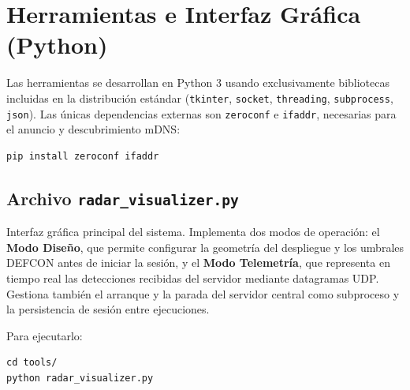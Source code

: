 

\section{Herramientas e Interfaz Gráfica (Python)}

Las herramientas se desarrollan en Python 3 usando exclusivamente bibliotecas incluidas en
la distribución estándar (\texttt{tkinter}, \texttt{socket}, \texttt{threading},
\texttt{subprocess}, \texttt{json}). Las únicas dependencias externas son \texttt{zeroconf}
e \texttt{ifaddr}, necesarias para el anuncio y descubrimiento mDNS:

\begin{lstlisting}[style=Consola]
pip install zeroconf ifaddr
\end{lstlisting}

\subsection{Archivo \texttt{radar\_visualizer.py}}

Interfaz gráfica principal del sistema. Implementa dos modos de operación: el \textbf{Modo
Diseño}, que permite configurar la geometría del despliegue y los umbrales DEFCON antes
de iniciar la sesión, y el \textbf{Modo Telemetría}, que representa en tiempo real las
detecciones recibidas del servidor mediante datagramas UDP. Gestiona también el arranque y
la parada del servidor central como subproceso y la persistencia de sesión entre ejecuciones.

Para ejecutarlo:

\begin{lstlisting}[style=Consola]
cd tools/
python radar_visualizer.py
\end{lstlisting}



